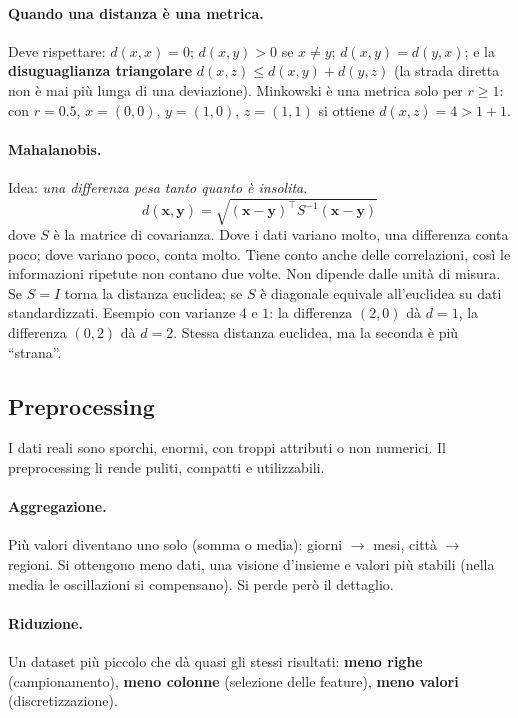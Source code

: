 \paragraph*{Quando una distanza è una metrica.} Deve rispettare: $d(x,x)=0$; $d(x,y)>0$ se $x\neq y$; $d(x,y)=d(y,x)$; e la \textbf{disuguaglianza triangolare} $d(x,z)\le d(x,y)+d(y,z)$ (la strada diretta non è mai più lunga di una deviazione). Minkowski è una metrica solo per $r\ge1$: con $r=0.5$, $x=(0,0)$, $y=(1,0)$, $z=(1,1)$ si ottiene $d(x,z)=4 > 1+1$.

\paragraph*{Mahalanobis.} Idea: \emph{una differenza pesa tanto quanto è insolita}.
\[
d(\mathbf{x},\mathbf{y})=\sqrt{(\mathbf{x}-\mathbf{y})^\top S^{-1}(\mathbf{x}-\mathbf{y})}
\]
dove $S$ è la matrice di covarianza. Dove i dati variano molto, una differenza conta poco; dove variano poco, conta molto. Tiene conto anche delle correlazioni, così le informazioni ripetute non contano due volte. Non dipende dalle unità di misura. Se $S=I$ torna la distanza euclidea; se $S$ è diagonale equivale all'euclidea su dati standardizzati.
Esempio con varianze $4$ e $1$: la differenza $(2,0)$ dà $d=1$, la differenza $(0,2)$ dà $d=2$. Stessa distanza euclidea, ma la seconda è più ``strana''.

\subsection*{Preprocessing}
I dati reali sono sporchi, enormi, con troppi attributi o non numerici. Il preprocessing li rende puliti, compatti e utilizzabili.

\paragraph*{Aggregazione.} Più valori diventano uno solo (somma o media): giorni $\to$ mesi, città $\to$ regioni. Si ottengono meno dati, una visione d'insieme e valori più stabili (nella media le oscillazioni si compensano). Si perde però il dettaglio.

\paragraph*{Riduzione.} Un dataset più piccolo che dà quasi gli stessi risultati: \textbf{meno righe} (campionamento), \textbf{meno colonne} (selezione delle feature), \textbf{meno valori} (discretizzazione).

